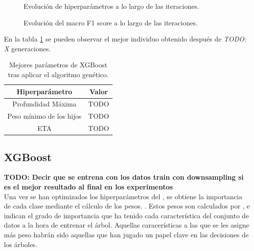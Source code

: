         \begin{figure}[H]
            \centering
            
            \caption{Evolución de hiperparámetros a lo largo de las iteraciones.}
            \label{EvolucionHiperparametrosImage}
         \end{figure}

        \begin{figure}[H]
            \centering
            
            \caption{Evolución del macro F1 score a lo largo de las iteraciones.}
            \label{EvolucionF1ScoreImage}
         \end{figure}
         
        En la tabla \ref{BestGASolutionTable} se pueden observar el mejor individuo obtenido después de \textit{TODO: X} generaciones.

        \begin{table}[H]
            \centering
                \begin{tabular}{ |c|c| } 
                    \hline
                    \textbf{Hiperparámetro} & \textbf{Valor}\\
                    \hline
                        Profundidad Máxima & TODO \\ 
                        Peso mínimo de los hijos & TODO \\ 
                        ETA & TODO \\ 
                    \hline

                \end{tabular}
            \caption{Mejores parámetros de XGBoost tras aplicar el algoritmo genético.}
            \label{BestGASolutionTable}
        \end{table}



    \subsection{XGBoost}


        \textbf{TODO: Decir que se entrena con los datos train con downsampling si es el mejor resultado al final en los experimentos}\\

        Una vez se han optimizados los hiperparámetros del , se obtiene la importancia de cada clase mediante el cálculo de los pesos. \cite{XGBoostFeatureWeightsMeaning}. Estos pesos son calculados por , e indican el grado de importancia que ha tenido cada característica del conjunto de datos a la hora de entrenar el árbol. Aquellas caracerísticas a las que se les asigne más peso habrán sido aquellas que han jugado un papel clave en las decisiones de los árboles.

